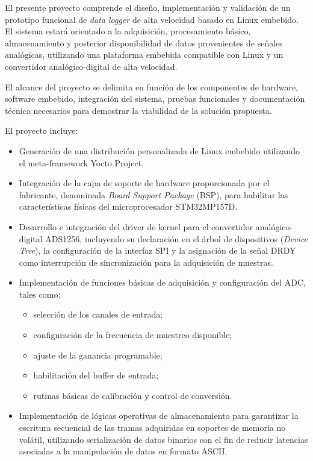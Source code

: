 \documentclass[
11pt, %
]{charter}
\begin{document}
El presente proyecto comprende el diseño, implementación y validación de un prototipo funcional de \textit{data logger} de alta velocidad basado en Linux embebido. El sistema estará orientado a la adquisición, procesamiento básico, almacenamiento y posterior disponibilidad de datos provenientes de señales analógicas, utilizando una plataforma embebida compatible con Linux y un convertidor analógico-digital de alta velocidad.

El alcance del proyecto se delimita en función de los componentes de hardware, software embebido, integración del sistema, pruebas funcionales y documentación técnica necesarios para demostrar la viabilidad de la solución propuesta.

El proyecto incluye:

\begin{itemize}
    \item Generación de una distribución personalizada de Linux embebido utilizando el meta-framework Yocto Project.

    \item Integración de la capa de soporte de hardware proporcionada por el fabricante, denominada \textit{Board Support Package} (BSP), para habilitar las características físicas del microprocesador STM32MP157D.

    \item Desarrollo e integración del driver de kernel para el convertidor analógico-digital ADS1256, incluyendo su declaración en el árbol de dispositivos (\textit{Device Tree}), la configuración de la interfaz SPI y la asignación de la señal DRDY como interrupción de sincronización para la adquisición de muestras.

    \item Implementación de funciones básicas de adquisición y configuración del ADC, tales como:
    \begin{itemize}
        \item selección de los canales de entrada;
        \item configuración de la frecuencia de muestreo disponible;
        \item ajuste de la ganancia programable;
        \item habilitación del buffer de entrada;
        \item rutinas básicas de calibración y control de conversión.
    \end{itemize}

    \item Implementación de lógicas operativas de almacenamiento para garantizar la escritura secuencial de las tramas adquiridas en soportes de memoria no volátil, utilizando serialización de datos binarios con el fin de reducir latencias asociadas a la manipulación de datos en formato ASCII.


\end{itemize}
\end{document}
